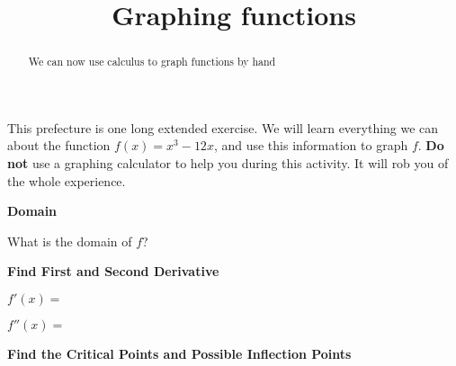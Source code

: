\documentclass{ximera}
\title{Graphing functions}
\begin{document}
\begin{abstract}
  We can now use calculus to graph functions by hand
\end{abstract}

\maketitle




This prefecture is one long extended exercise.  We will learn everything we can about the function $f(x) = x^3-12x$, and use this information to graph $f$.
\textbf{Do not} use a graphing calculator to help you during this activity.  It will rob you of the whole experience.



\textbf{Domain}

\begin{question}
What is the domain of $f$?
 
    \begin{multipleChoice}
    \end{multipleChoice}
    
\end{question}    


 \textbf{Find First and Second Derivative}
 
 \begin{question}
 	$f'(x)=$
 \end{question}
 
 \begin{question}
 	$f''(x)=$
 \end{question}
 
 \textbf{Find the Critical Points and Possible Inflection Points}
 
\end{document}
